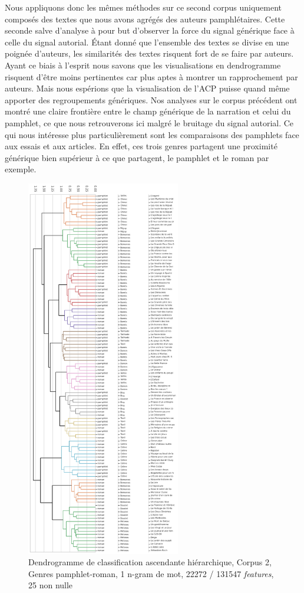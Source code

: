 Nous appliquons donc les mêmes méthodes sur ce second corpus uniquement composés des textes que nous avons agrégés des auteurs pamphlétaires. Cette seconde salve d'analyse à pour but d'observer la force du signal générique face à celle du signal autorial. Étant donné que l'ensemble des textes se divise en une poignée d'auteurs, les similarités des textes risquent fort de se faire par auteurs. Ayant ce biais à l'esprit nous savons que les visualisations en dendrogramme risquent d'être moins pertinentes car plus aptes à montrer un rapprochement par auteurs. Mais nous espérions que la visualisation de l'ACP puisse quand même apporter des regroupements génériques. Nos analyses sur le corpus précédent ont montré une claire frontière entre le champ générique de la narration et celui du pamphlet, ce que nous retrouverons ici malgré le bruitage du signal autorial. Ce qui nous intéresse plus particulièrement sont les comparaisons des pamphlets face aux essais et aux articles. En effet, ces trois genres partagent une proximité générique bien supérieur à ce que partagent, le pamphlet et le roman par exemple. 

\begin{figure}
\centering %
\includegraphics[width=0.6\textwidth]{img/dendogram-corpus-2-PamRoman.png}
\caption{Dendrogramme de classification ascendante hiérarchique, Corpus 2, Genres pamphlet-roman, 1 n-gram de mot, 22272 / 131547 \textit{features}, 25 non nulle}
\label{'fig:dendogram-corpus-2-PamRoman'}
\end{figure}

